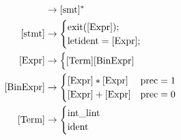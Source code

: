 \begin{align}
    [\text{prog}] &\to [\text{smt}]^* \\
    [\text{stmt}] &\to
    \begin{cases}
        \text{exit}([\text{Expr}]); \\
        \text{let}\space\text{ident} = [\text{Expr}];
    \end{cases} \\
    [\text{Expr}] &\to
    \begin{cases}
        [\text{Term}]
        [\text{BinExpr}]
    \end{cases} \\
    [\text{BinExpr}] &\to
    \begin{cases}
        [\text{Expr}] * [\text{Expr}] & \text{prec} = 1 \\
        [\text{Expr}] + [\text{Expr}] & \text{prec} = 0 \\
    \end{cases} \\
    [\text{Term}] &\to
    \begin{cases}
        \text{int\_lint} \\
        \text{ident}
    \end{cases}
\end{align}
